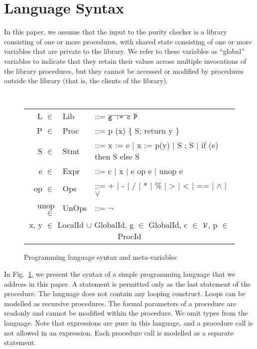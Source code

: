 \newcommand{\elt}{\ensuremath{\in} }
\newcommand{\domain}[1]{#1}

\section{Language Syntax}
\label{sec:background}

In this paper, we assume that the input to the purity checker is a library consisting
of one or more procedures, with shared state consisting of one or more variables
that are private to the library. We refer to these variables as ``global'' variables to
indicate that they retain their values across multiple invocations of the library
procedures, but they cannot be accessed or modified by procedures outside
the library (that is, the clients of the library).

\begin{figure}[t!]
{\tt
\begin{tabular}{rll}
L \elt & \domain{Lib} & ::= $\overline{\texttt{g := c}}$ $\overline{\texttt{P}}$ \\
P \elt & \domain{Proc} & ::= p (x) \{ S; return y \} \\
S \elt & \domain{Stmt} & ::=  x := e | x := p(y) | S ; S | if (e) then S else S \\
e \elt & \domain{Expr} & ::= c | x | e op e | unop e \\
op \elt & \domain{Ops} & ::= + | - | / | * | \% | > | < | == | $\wedge$ | $\vee$ \\
unop \elt & \domain{UnOps} & ::= $\neg$ \\
\multicolumn{3}{c}{
x, y \elt  \domain{LocalId} $\cup$ \domain{GlobalId},
g \elt \domain{GlobalId},
c \elt $\mathcal{V}$,
p \elt \domain{ProcId}
}
\end{tabular}
}
\caption{Programming language syntax and meta-variables}
 \label{fig:grammar}
\end{figure}

In Fig.~\ref{fig:grammar}, we present the syntax of a simple
programming language that we address in this paper.
A  statement is permitted only as the last statement of
the procedure.
The language does not contain any looping construct.
Loops can be modelled as recursive procedures.
The formal parameters of a procedure are readonly and cannot be
modified within the procedure.
We omit types from the language.
Note that expressions are pure in this language, and a procedure call
is not allowed in an expression. Each procedure call is modelled as a
separate statement.

